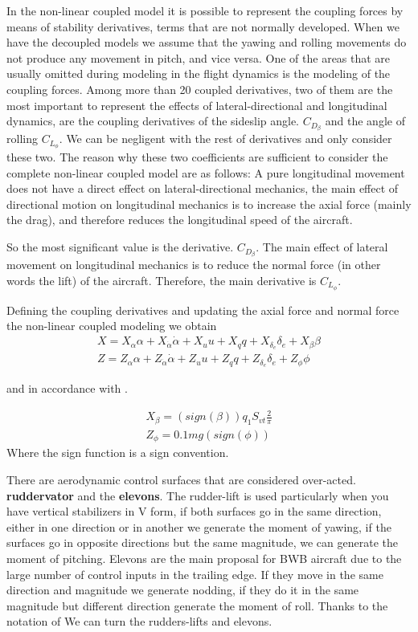 In the non-linear coupled model it is possible to represent the coupling forces by means of stability derivatives, terms that are not normally developed. When we have the decoupled models we assume that the yawing and rolling movements do not produce any movement in pitch, and vice versa. One of the areas that are usually omitted during modeling in the flight dynamics is the modeling of the coupling forces. Among more than 20 coupled derivatives, two of them are the most important to represent the effects of lateral-directional and longitudinal dynamics, are the coupling derivatives of the sideslip angle. $C_{D_{\beta}}$ and the angle of rolling $C_{L_{\phi}}$. We can be negligent with the rest of derivatives and only consider these two. The reason why these two coefficients are sufficient to consider the complete non-linear coupled model are as follows: A pure longitudinal movement does not have a direct effect on lateral-directional mechanics, the main effect of directional motion on longitudinal mechanics is to increase the axial force (mainly the drag), and therefore reduces the longitudinal speed of the aircraft.

So the most significant value is the derivative. $C_{D_{\beta}}$. The main effect of lateral movement on longitudinal mechanics is to reduce the normal force (in other words the lift) of the aircraft. Therefore, the main derivative is $C_{L_{\phi}}$. 

Defining the coupling derivatives and updating the axial force and normal force the non-linear coupled modeling we obtain
\begin{gather}
    X = X_{\alpha} \alpha + X_{\dot \alpha}\dot \alpha + X_{u} u + X_{q} q + X_{\delta_{e}} \delta_{e} + X_{\beta} \beta \\
    Z = Z_{\alpha} \alpha + Z_{\dot \alpha}\dot \alpha + Z_{u} u + Z_{q} q + Z_{\delta_{e}} \delta_{e} + Z_{\phi} \phi
\end{gather}

and in accordance with \cite{Mohammad2020}. 

\begin{gather}
    X_{\beta} = (sign(\beta))q_{1}S_{vt}\frac{2}{\pi} \\
    Z_{\phi} = 0.1 mg (sign(\phi))
\end{gather}
Where the sign function is a sign convention. 

There are aerodynamic control surfaces that are considered over-acted. \textbf{ruddervator} and the \textbf{elevons}. The rudder-lift is used particularly when you have vertical stabilizers in V form, if both surfaces go in the same direction, either in one direction or in another we generate the moment of yawing, if the surfaces go in opposite directions but the same magnitude, we can generate the moment of pitching. Elevons are the main proposal for BWB aircraft due to the large number of control inputs in the trailing edge. If they move in the same direction and magnitude we generate nodding, if they do it in the same magnitude but different direction generate the moment of roll. Thanks to the notation of \cite{Beard2012} We can turn the rudders-lifts and elevons. 

